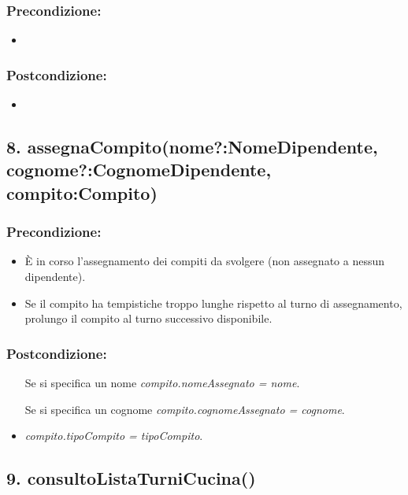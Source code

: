 \subsubsection*{Precondizione:}
\begin{itemize}
    \item 
\end{itemize}

\subsubsection*{Postcondizione:}
\begin{itemize}
    \item 
\end{itemize}

\subsection*{8. assegnaCompito(nome?:NomeDipendente, cognome?:CognomeDipendente, compito:Compito)}

\subsubsection*{Precondizione:}
\begin{itemize}
    \item È in corso l'assegnamento dei compiti da svolgere (non assegnato a nessun dipendente).
    \item Se il compito ha tempistiche troppo lunghe rispetto al turno di assegnamento, prolungo il compito al turno successivo disponibile.
\end{itemize}

\subsubsection*{Postcondizione:}
\begin{itemize}
    \item [Se si specifica un nome] \textit{compito.nomeAssegnato = nome}.
    \item [Se si specifica un cognome] \textit{compito.cognomeAssegnato = cognome}.
    \item \textit{compito.tipoCompito = tipoCompito}.
\end{itemize}

\subsection*{9. consultoListaTurniCucina()}

